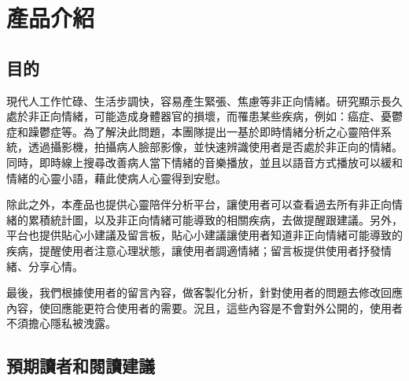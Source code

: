 \documentclass[12pt]{scrreprt}
\begin{document}
\chapter{產品介紹}

\section{目的}

現代人工作忙碌、生活步調快，容易產生緊張、焦慮等非正向情緒。研究顯示長久處於非正向情緒，可能造成身體器官的損壞，而罹患某些疾病，例如：癌症、憂鬱症和躁鬱症等。為了解決此問題，本團隊提出一基於即時情緒分析之心靈陪伴系統，透過攝影機，拍攝病人臉部影像，並快速辨識使用者是否處於非正向的情緒。同時，即時線上搜尋改善病人當下情緒的音樂播放，並且以語音方式播放可以緩和情緒的心靈小語，藉此使病人心靈得到安慰。

除此之外，本產品也提供心靈陪伴分析平台，讓使用者可以查看過去所有非正向情緒的累積統計圖，以及非正向情緒可能導致的相關疾病，去做提醒跟建議。另外，平台也提供貼心小建議及留言板，貼心小建議讓使用者知道非正向情緒可能導致的疾病，提醒使用者注意心理狀態，讓使用者調適情緒；留言板提供使用者抒發情緒、分享心情。

最後，我們根據使用者的留言內容，做客製化分析，針對使用者的問題去修改回應內容，使回應能更符合使用者的需要。況且，這些內容是不會對外公開的，使用者不須擔心隱私被洩露。


\section{預期讀者和閱讀建議}
\end{document}

